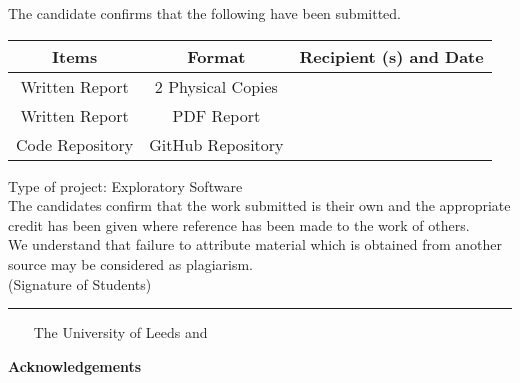 \frontcover%

\noindent The candidate confirms that the following have been submitted.
\begin{table}[ht!]
    \begin{tabular}{*{3}{c}}
        \toprule
        Items & Format & Recipient (s) and Date \\ 
        \midrule
        \midrule
        Written Report & 2 Physical Copies & \\ 
        \midrule
        Written Report & PDF Report & \\
        \midrule
        Code Repository & GitHub Repository & \\
        \bottomrule
    \end{tabular}
\end{table}

\noindent Type of project: Exploratory Software
\vspace{\fill}\\
\noindent The candidates confirm that the work submitted is their own and the
appropriate credit has been given where reference has been made to the
work of others.
\vspace{\fill}\\
\noindent We understand that failure to attribute material which is obtained
from another source may be considered as plagiarism.
\vspace{\fill}\\
\flushright(Signature of Students) \rule{100mm}{1pt}
\flushleft\
\vspace{\fill}
\textcopyright~\session~The University of Leeds and~\fullname\

\begin{dissertationsummary}

\end{dissertationsummary}

\clearpage
\centering\textbf{Acknowledgements}
\flushleft\


\tableofcontents


